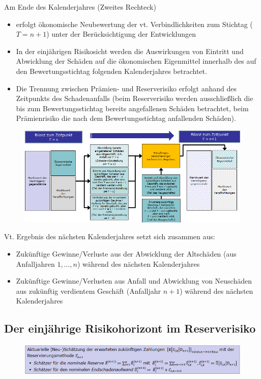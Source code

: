 \documentclass[12pt]{report}
\theoremstyle{dotless}
\theoremstyle{definition}
\begin{document}
Am Ende des Kalenderjahres (Zweites Rechteck)
\begin{itemize}
\item erfolgt ökonomische Neubewertung der vt. Verbindlichkeiten zum Stichtag ($T=n+1$) unter der Berücksichtigung der Entwicklungen
\end{itemize}

\begin{itemize}
\item In der einjährigen Risikosicht werden die Auswirkungen von Eintritt und Abwicklung der Schäden auf die ökonomischen Eigenmittel innerhalb des auf den Bewertungsstichtag folgenden Kalenderjahres betrachtet.
\item Die Trennung zwischen Prämien- und Reserverisiko erfolgt anhand des Zeitpunkts des Schadenanfalls (beim Reserverisiko werden ausschließlich die bis zum Bewertungsstichtag bereits angefallenen Schäden betrachtet, beim Prämienrisiko die nach dem Bewertungsstichtag anfallenden Schäden).
\end{itemize}

\begin{figure}[ht]
	\centering
	\includegraphics[width= \textwidth]{Bilder/Kalendersicht2.png}
\end{figure}


Vt. Ergebnis des nächsten Kalenderjahres setzt sich zusammen aus:
\begin{itemize}
\item Zukünftige Gewinne/Verluste aus der Abwicklung der Altschäden (aus
Anfalljahren $1, …, n$) während des nächsten Kalenderjahres
\item Zukünftige Gewinne/Verlusten aus Anfall und Abwicklung von Neuschäden aus
zukünftig verdientem Geschäft (Anfalljahr $n+1$) während des nächsten
Kalenderjahres
\end{itemize}


\subsection{Der einjährige Risikohorizont im Reserverisiko}
\begin{figure}[ht]
	\centering
	\includegraphics[width= \textwidth]{Bilder/Schaetzer2.png}
\end{figure}
\end{document}
